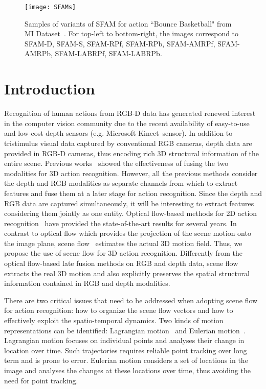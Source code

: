 \documentclass[10pt,twocolumn,letterpaper]{article}
\begin{document}
\begin{figure}[t]
\begin{center}
{\texttt{[image: SFAMs]}}
\end{center}
\caption{Samples of variants of SFAM for action ``Bounce Basketball" from MI Dataset~\cite{liu2016benchmarking}. For top-left to bottom-right, the images correspond to SFAM-D, SFAM-S, SFAM-RPf, SFAM-RPb, SFAM-AMRPf, SFAM-AMRPb, SFAM-LABRPf, SFAM-LABRPb. }
\label{SFAMs}
\end{figure}

\section{Introduction}
Recognition of human actions from RGB-D data has generated
renewed interest in the computer vision community due to the 
recent availability of easy-to-use and low-cost depth sensors (e.g. 
Microsoft Kinect~\texttrademark sensor). In addition to tristimulus visual data 
captured by conventional RGB cameras, depth data are provided in RGB-D cameras, 
thus encoding rich 3D structural information of the entire scene. 
Previous works~\cite{Nie2015,Kong2015CVPR,
hu2015jointly,wu2015watch,yu2016structure,jia2016low} showed the effectiveness 
of fusing the two modalities for 3D action recognition. However, all the 
previous methods consider the depth and RGB modalities as separate channels 
from which to extract features and fuse them at a later stage for action 
recognition. Since the depth and RGB data are captured simultaneously, it will 
be interesting to extract features considering them jointly as one entity. 
Optical flow-based methods for 2D action 
recognition~\cite{wang2013action,lan2015beyond,peng2014action,peng2016bag, 
wang2015action} have provided the state-of-the-art results for several years. 
In contrast to optical flow which provides the projection of the scene motion 
onto the image plane,
scene flow~\cite{vedula2005three,hadfield2014scene,menze2015object,hornacek2014sphereflow,jaimezprimal,sun2015layered,quiroga2014dense}
estimates the actual 3D motion field. 
Thus, we propose the use of scene flow for 3D action recognition.  
Differently from the optical flow-based late fusion methods on RGB and depth 
data, scene flow extracts the real 3D motion and also explicitly preserves 
the spatial structural information contained in RGB and depth modalities. 


There are two critical issues that need to be addressed when adopting 
scene flow for action recognition: how to organize the scene flow vectors and 
how to effectively exploit the spatio-temporal dynamics. 
Two kinds of motion representations can be identified: 
Lagrangian 
motion~\cite{wang2013action,lan2015beyond,peng2014action,
wang2015action,peng2016bag,pichao2016} and Eulerian 
motion~\cite{bobick2001recognition,
man2006individual,Yang2012a,pichao2015,pichaoTHMS,bilen2016dynamic}. Lagrangian 
motion focuses on individual points and analyses their change in location over 
time. Such trajectories requires reliable point tracking over long 
term and is prone to error. Eulerian motion considers a set of 
locations in the image and analyses the changes at these locations over time, 
thus avoiding the need for point tracking.
\end{document}
